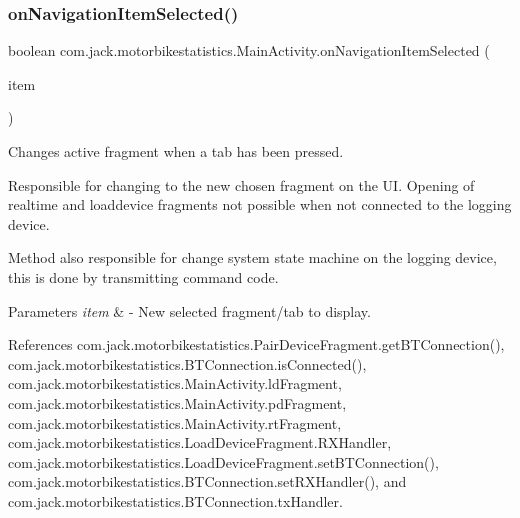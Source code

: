 \subsubsection{\texorpdfstring{on\+Navigation\+Item\+Selected()}{onNavigationItemSelected()}}
{\footnotesize\ttfamily boolean com.\+jack.\+motorbikestatistics.\+Main\+Activity.\+on\+Navigation\+Item\+Selected (\begin{DoxyParamCaption}\item[{Menu\+Item}]{item }\end{DoxyParamCaption})\hspace{0.3cm}{\ttfamily [inline]}}



Changes active fragment when a tab has been pressed. 

Responsible for changing to the new chosen fragment on the UI. Opening of realtime and loaddevice fragments not possible when not connected to the logging device.

Method also responsible for change system state machine on the logging device, this is done by transmitting command code.


\begin{DoxyParams}{Parameters}
{\em item} & -\/ New selected fragment/tab to display. \\
\hline
\end{DoxyParams}


References com.\+jack.\+motorbikestatistics.\+Pair\+Device\+Fragment.\+get\+B\+T\+Connection(), com.\+jack.\+motorbikestatistics.\+B\+T\+Connection.\+is\+Connected(), com.\+jack.\+motorbikestatistics.\+Main\+Activity.\+ld\+Fragment, com.\+jack.\+motorbikestatistics.\+Main\+Activity.\+pd\+Fragment, com.\+jack.\+motorbikestatistics.\+Main\+Activity.\+rt\+Fragment, com.\+jack.\+motorbikestatistics.\+Load\+Device\+Fragment.\+R\+X\+Handler, com.\+jack.\+motorbikestatistics.\+Load\+Device\+Fragment.\+set\+B\+T\+Connection(), com.\+jack.\+motorbikestatistics.\+B\+T\+Connection.\+set\+R\+X\+Handler(), and com.\+jack.\+motorbikestatistics.\+B\+T\+Connection.\+tx\+Handler.



